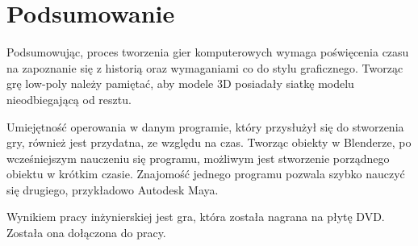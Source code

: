 \chapter{Podsumowanie}

\indent Podsumowując, proces tworzenia gier komputerowych wymaga poświęcenia czasu na zapoznanie się z historią oraz wymaganiami co do stylu graficznego. Tworząc grę low-poly należy pamiętać, aby modele 3D posiadały siatkę modelu nieodbiegającą od resztu. 

\indent Umiejętność operowania w danym programie, który przysłużył się do stworzenia gry, również jest przydatna, ze względu na czas. Tworząc obiekty w Blenderze, po wcześniejszym nauczeniu się programu, możliwym jest stworzenie porządnego obiektu w krótkim czasie. Znajomość jednego programu pozwala szybko nauczyć się drugiego, przykładowo Autodesk Maya. 

\indent Wynikiem pracy inżynierskiej jest gra, która została nagrana na płytę DVD. Została ona dołączona do pracy.
